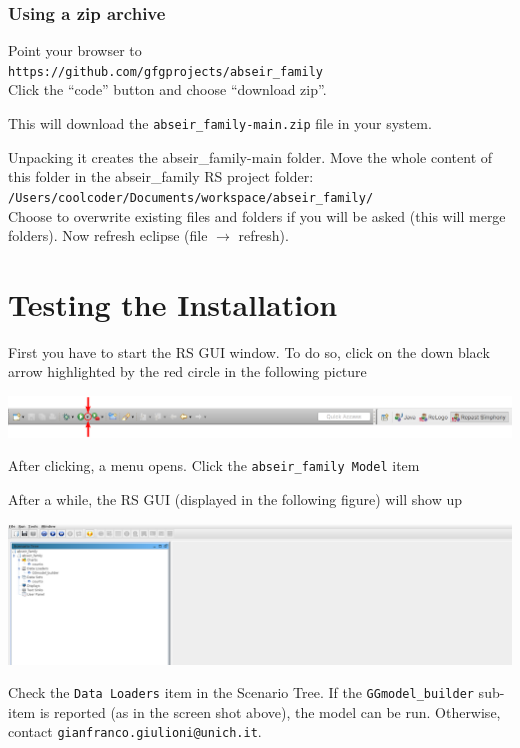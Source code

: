 \documentclass{article}
\begin{document}
\vskip2mm

\subsubsection{Using a zip archive}
Point your browser to\\ 
\verb+https://github.com/gfgprojects/abseir_family+\\
Click the ``code'' button and choose ``download zip''.

This will download the \verb+abseir_family-main.zip+ file in your system.

Unpacking it creates the abseir\_family-main folder.
Move the whole content of this folder in the abseir\_family RS project folder:\\  
\verb+/Users/coolcoder/Documents/workspace/abseir_family/+\\
Choose to overwrite existing files and folders if you will be asked (this will merge folders). 
Now refresh eclipse (file $\rightarrow$ refresh).



\section{Testing the Installation}


First you have to start the RS GUI window. To do so, click on the down black arrow highlighted by the red circle in the following picture

\noindent
\includegraphics[scale=0.195]{fig_gabriele_rs_execution1a}

After clicking, a menu opens. Click the \verb+abseir_family Model+ item

After a while, the RS GUI (displayed in the following figure) will show up

\noindent
\includegraphics[scale=0.2]{fig_abseir_family_rs_gui0}

Check the \verb+Data Loaders+ item in the Scenario Tree. If the \verb+GGmodel_builder+ sub-item is reported (as in the screen shot above), the model can be run. Otherwise, contact \verb+gianfranco.giulioni@unich.it+. 
\end{document}
